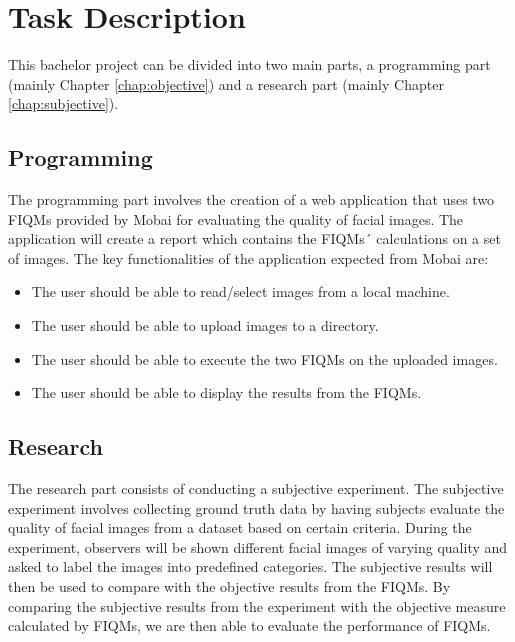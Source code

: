 \section{Task Description}
\label{sec:TaskD}
This bachelor project can be divided into two main parts, a programming part (mainly Chapter \ref{chap:objective}) and a research part (mainly Chapter \ref{chap:subjective}).

\subsection*{Programming}
The programming part involves the creation of a web application that uses two FIQMs provided by Mobai for evaluating the quality of facial images. The application will create a report which contains the FIQMs´ calculations on a set of images. The key functionalities of the application expected from Mobai are: 
\begin{itemize}
    \item The user should be able to read/select images from a local machine.
    \item The user should be able to upload images to a directory.
    \item The user should be able to execute the two FIQMs on the uploaded images.
    \item The user should be able to display the results from the FIQMs. 
\end{itemize}

\subsection*{Research}
The research part consists of conducting a subjective experiment. The subjective experiment involves collecting ground truth data by having subjects evaluate the quality of facial images from a dataset based on certain criteria. During the experiment, observers will be shown different facial images of varying quality and asked to label the images into predefined categories. The subjective results will then be used to compare with the objective results from the FIQMs. By comparing the subjective results from the experiment with the objective measure calculated by FIQMs, we are then able to evaluate the performance of FIQMs. 

